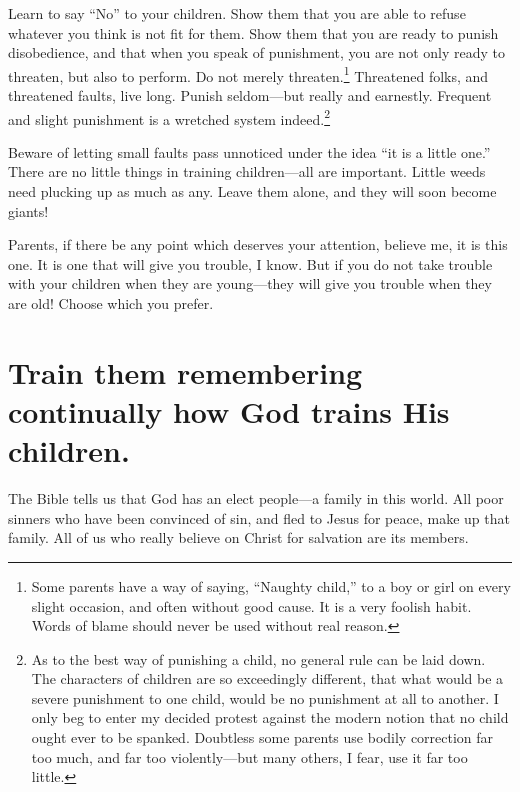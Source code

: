 \documentclass[
]{book}
\begin{document}
Learn to say ``No'' to your children. Show them that you are able to refuse whatever you think is not fit for them. Show them that you are ready to punish disobedience, and that when you speak of punishment, you are not only ready to threaten, but also to perform. Do not merely threaten.\footnote{Some parents have a way of saying, ``Naughty child,'' to a boy or girl on every slight occasion, and often without good cause. It is a very foolish habit. Words of blame should never be used without real reason.} Threatened folks, and threatened faults, live long. Punish seldom---but really and earnestly. Frequent and slight punishment is a wretched system indeed.\footnote{As to the best way of punishing a child, no general rule can be laid down. The characters of children are so exceedingly different, that what would be a severe punishment to one child, would be no punishment at all to another. I only beg to enter my decided protest against the modern notion that no child ought ever to be spanked. Doubtless some parents use bodily correction far too much, and far too violently---but many others, I fear, use it far too little.}

Beware of letting small faults pass unnoticed under the idea ``it is a little one.'' There are no little things in training children---all are important. Little weeds need plucking up as much as any. Leave them alone, and they will soon become giants!

Parents, if there be any point which deserves your attention, believe me, it is this one. It is one that will give you trouble, I know. But if you do not take trouble with your children when they are young---they will give you trouble when they are old! Choose which you prefer.

\hypertarget{train-them-remembering-continually-how-god-trains-his-children.}{%
\chapter{Train them remembering continually how God trains His children.}\label{train-them-remembering-continually-how-god-trains-his-children.}}

The Bible tells us that God has an elect people---a family in this world. All poor sinners who have been convinced of sin, and fled to Jesus for peace, make up that family. All of us who really believe on Christ for salvation are its members.
\end{document}
